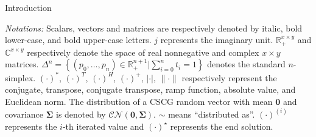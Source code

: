 \documentclass[journal]{IEEEtran}
\begin{document}
\begin{section}{Introduction}

	\emph{Notations:} Scalars, vectors and matrices are respectively denoted by italic, bold lower-case, and bold upper-case letters.
	$j$ represents the imaginary unit.
	$\mathbb{R}_+^{x \times y}$ and $\mathbb{C}^{x \times y}$ respectively denote the space of real nonnegative and complex $x \times y$ matrices.
	$\Delta^n = \left\{ (p_0,\dots,p_n) \in \mathbb{R}_+^{n+1}|\sum_{i=0}^n t_i = 1 \right\}$ denotes the standard $n$-simplex.
	$(\cdot)^*$, $(\cdot)^T$, $(\cdot)^H$, $(\cdot)^+$, $\lvert{\cdot}\rvert$, $\lVert{\cdot}\rVert$ respectively represent the conjugate, transpose, conjugate transpose, ramp function, absolute value, and Euclidean norm.
	The distribution of a CSCG random vector with mean $\boldsymbol{0}$ and covariance $\boldsymbol{\Sigma}$ is denoted by $\mathcal{CN}(\boldsymbol{0},\boldsymbol{\Sigma})$.
	$\sim$ means ``distributed as''.
	$(\cdot)^{(i)}$ represents the $i$-th iterated value and $(\cdot)^{\star}$ represents the end solution.
\end{section}
\end{document}
